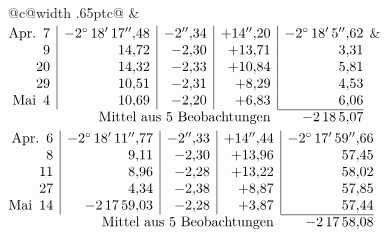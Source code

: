 \noindent\begin{tabular}{@{}c@{\hspace{.4em}\vrule width .65pt\hspace{.4em}}c@{}}
 &
 \\[.18ex]
\(\begin{array}[t]{@{}r|r|r|r|r@{}}
\text{Apr.}\enspace 7 & -2^\circ\,18'\,17''{,}48 & -2''{,}34 & +14''{,}20 & -2^\circ\,18'\,5''{,}62\\
9 & 14{,}72 & -2{,}30 & +13{,}71 & 3{,}31\\
20 & 14{,}32 & -2{,}33 & +10{,}84 & 5{,}81\\
29 & 10{,}51 & -2{,}31 & +8{,}29 & 4{,}53\\
\text{Mai}\enspace 4 & 10{,}69 & -2{,}20 & +6{,}83 & 6{,}06\\
\cline{5-5}
\multicolumn{4}{r}{\text{Mittel aus 5 Beobachtungen}} & -2\,18\,5{,}07
\end{array}\)
&
\(\begin{array}[t]{@{}r|r|r|r|r@{}}
\text{Apr.}\enspace 6 & -2^\circ\,18'\,11''{,}77 & -2''{,}33 & +14''{,}44 & -2^\circ\,17'\,59''{,}66\\
8 & 9{,}11 & -2{,}30 & +13{,}96 & 57{,}45\\
11 & 8{,}96 & -2{,}28 & +13{,}22 & 58{,}02\\
27 & 4{,}34 & -2{,}38 & +8{,}87 & 57{,}85\\
\text{Mai}\enspace 14 & -2\,17\,59{,}03 & -2{,}28 & +3{,}87 & 57{,}44\\
\cline{5-5}
\multicolumn{4}{r}{\text{Mittel aus 5 Beobachtungen}} & -2\,17\,58{,}08
\end{array}\)
\end{tabular}\par\medskip
